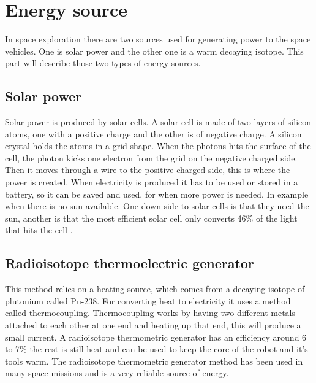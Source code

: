 \section{Energy source}

In space exploration there are two sources used for generating power to the space vehicles. One is solar power and the other one is a warm decaying isotope. \newline This part will describe those two types of energy sources.

\subsection{Solar power}

Solar power is produced by solar cells. A solar cell is made of two layers of silicon atoms, one with a positive charge and the other is of negative charge. A silicon crystal holds the atoms in a grid shape. When the photons hits the surface of the cell, the photon kicks one electron from the grid on the negative charged side. Then it moves through a wire to the positive charged side, this is where the power is created. When electricity is produced it has to be used or stored in a battery, so it can be saved and used, for when more power is needed, In example when there is no sun available. One down side to solar cells is that they need the sun, another is that the most efficient solar cell only converts 46\% of the light that hits the cell \cite{SolarPanels}.

\subsection{Radioisotope thermoelectric generator}

This method relies on a heating source, which comes from a decaying isotope of plutonium called Pu-238. For converting heat to electricity it uses a method called thermocoupling. Thermocoupling works by having two different metals attached to each other at one end and heating up that end, this will produce a small current.
A radioisotope thermometric generator has an efficiency around 6 to 7\% the rest is still heat and can be used to keep the core of the robot and it's tools warm. The radioisotope thermometric generator method has been used in many space missions and is a very reliable source of energy\cite{RTG}.

